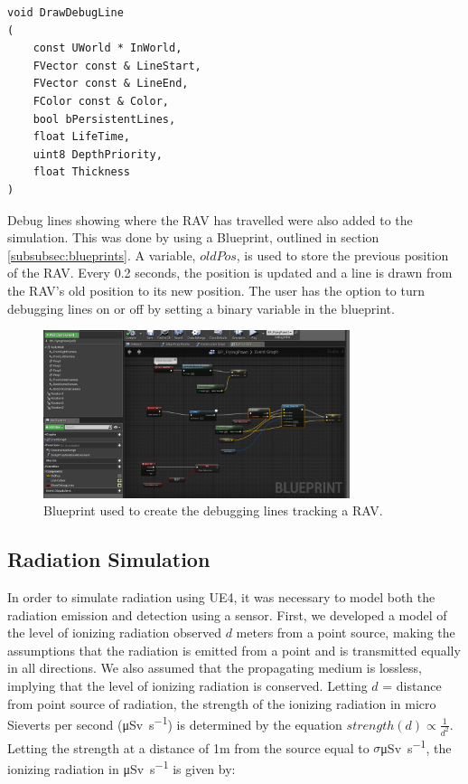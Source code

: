 \begin{verbatim}
void DrawDebugLine
(
    const UWorld * InWorld,
    FVector const & LineStart,
    FVector const & LineEnd,
    FColor const & Color,
    bool bPersistentLines,
    float LifeTime,
    uint8 DepthPriority,
    float Thickness
)
\end{verbatim}
\par


Debug lines showing where the RAV has travelled were also added to the simulation. This was done by using a Blueprint, outlined in section \ref{subsubsec:blueprints}. A variable, $oldPos$, is used to store the previous position of the RAV. Every 0.2 seconds, the position is updated and a line is drawn from the RAV's old position to its new position. The user has the option to turn debugging lines on or off by setting a binary variable in the blueprint.

\begin{figure}
    \centering
    \includegraphics[width=0.8\textwidth]{Chapters/SimulationEnv/Figs/DebuggingLines/PathTracingDebugLines.png}
    \caption{Blueprint used to create the debugging lines tracking a RAV.}
    \label{fig:TracingDebuggingLines}
\end{figure}

\subsection{Radiation Simulation}
In order to simulate radiation using UE4, it was necessary to model both the radiation emission and detection using a sensor. First, we developed a model of the level of ionizing radiation observed $d$ meters from a point source, making the assumptions that the radiation is emitted from a point and is transmitted equally in all directions. We also assumed that the propagating medium is lossless, implying that the level of ionizing radiation is conserved. Letting $d$ = distance from point source of radiation, the strength of the ionizing radiation in micro Sieverts per second (\si{\micro\sievert\per\second}) is determined by the equation  $strength(d) \propto \frac{1}{d^2}$. Letting the strength at a distance of 1m from the source equal to
$\sigma$\si{\micro\sievert\per\second}, the ionizing radiation in \si{\micro\sievert\per\second} is given by:

